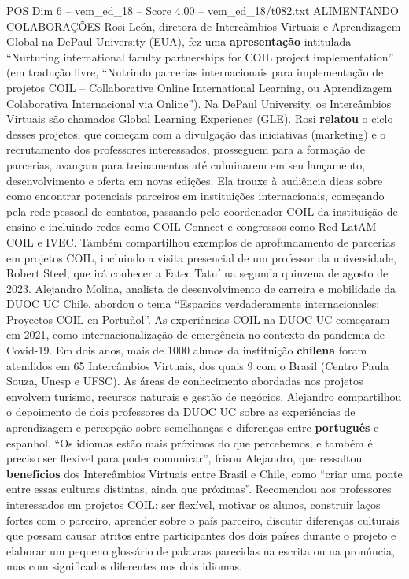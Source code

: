 \begin{textsample}{POS Dim 6 – vem\_ed\_18 – Score 4.00 – vem\_ed\_18/t082.txt}  \label{ex:f6_pos_079}
ALIMENTANDO COLABORAÇÕES Rosi León, diretora de Intercâmbios Virtuais e Aprendizagem Global na DePaul University (EUA), fez uma \textbf{apresentação} intitulada “Nurturing international faculty partnerships for COIL project implementation” (em tradução livre, “Nutrindo parcerias internacionais para implementação de projetos COIL – Collaborative Online International Learning, ou Aprendizagem Colaborativa Internacional via Online”).
Na DePaul University, os Intercâmbios Virtuais são chamados Global Learning Experience (GLE).
Rosi \textbf{relatou} o ciclo desses projetos, que começam com a divulgação das iniciativas (marketing) e o recrutamento dos professores interessados, prosseguem para a formação de parcerias, avançam para treinamentos até culminarem em seu lançamento, desenvolvimento e oferta em novas edições.
Ela trouxe à audiência dicas sobre como encontrar potenciais parceiros em instituições internacionais, começando pela rede pessoal de contatos, passando pelo coordenador COIL da instituição de ensino e incluindo redes como COIL Connect e congressos como Red LatAM COIL e IVEC.
Também compartilhou exemplos de aprofundamento de parcerias em projetos COIL, incluindo a visita presencial de um professor da universidade, Robert Steel, que irá conhecer a Fatec Tatuí na segunda quinzena de agosto de 2023.
Alejandro Molina, analista de desenvolvimento de carreira e mobilidade da DUOC UC Chile, abordou o tema “Espacios verdaderamente internacionales: Proyectos COIL en Portuñol”.
As experiências COIL na DUOC UC começaram em 2021, como internacionalização de emergência no contexto da pandemia de Covid-19.
Em dois anos, mais de 1000 alunos da instituição \textbf{chilena} foram atendidos em 65 Intercâmbios Virtuais, dos quais 9 com o Brasil (Centro Paula Souza, Unesp e UFSC).
As áreas de conhecimento abordadas nos projetos envolvem turismo, recursos naturais e gestão de negócios.
Alejandro compartilhou o depoimento de dois professores da DUOC UC sobre as experiências de aprendizagem e percepção sobre semelhanças e diferenças entre \textbf{português} e espanhol. “Os idiomas estão mais próximos do que percebemos, e também é preciso ser flexível para poder comunicar”, frisou Alejandro, que ressaltou \textbf{benefícios} dos Intercâmbios Virtuais entre Brasil e Chile, como “criar uma ponte entre essas culturas distintas, ainda que próximas”.
Recomendou aos professores interessados em projetos COIL: ser flexível, motivar os alunos, construir laços fortes com o parceiro, aprender sobre o país parceiro, discutir diferenças culturais que possam causar atritos entre participantes dos dois países durante o projeto e elaborar um pequeno glossário de palavras parecidas na escrita ou na pronúncia, mas com significados diferentes nos dois idiomas.

\end{textsample}
